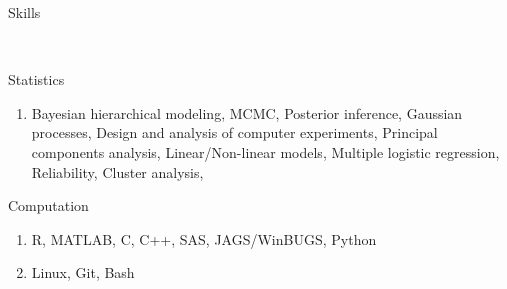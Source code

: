 \documentclass[12pt]{article}
\newcommand{\head}[1]{ %
    \bigskip %
    \bigskip %
    \begin{Large}\begin{bf}{#1}\end{bf}\end{Large} %

    \ \\ [-1.3cm] %

    \hrulefill}
\newcommand{\subhead}[1]{\begin{sc}{#1}\end{sc}}
\begin{document}
\head{Skills}

\subhead{Statistics}

\begin{enumerate}[label=$$, rightmargin=1.5cm]
\item Bayesian hierarchical modeling, MCMC, Posterior inference, Gaussian processes, Design and analysis of computer experiments, Principal components analysis, Linear/Non-linear models, Multiple logistic regression, Reliability, Cluster analysis,
\end{enumerate}

\subhead{Computation}

\begin{enumerate}[label=$\cdot$, rightmargin=1.5cm]
\item R, MATLAB, C, C++, SAS, JAGS/WinBUGS, Python
\item Linux, Git, Bash
\end{enumerate}
\end{document}
